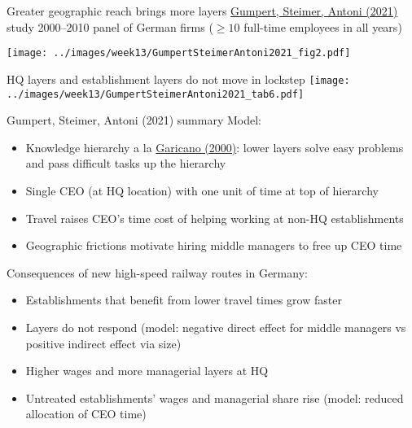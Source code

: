 \documentclass[11pt,notes=hide,aspectratio=169]{beamer}
\begin{document}
\begin{frame}{Greater geographic reach brings more layers}
\href{https://doi.org/10.1093/qje/qjab049}{Gumpert, Steimer, Antoni (2021)} study 2000–2010 panel of German firms ($\geq 10$ full-time employees in all years)
\begin{center}
\texttt{[image: ../images/week13/GumpertSteimerAntoni2021\_fig2.pdf]}
\end{center}
\end{frame}
\begin{frame}{HQ layers and establishment layers do not move in lockstep}
\texttt{[image: ../images/week13/GumpertSteimerAntoni2021\_tab6.pdf]}
\end{frame}
\begin{frame}{Gumpert, Steimer, Antoni (2021) summary}
Model:
\begin{itemize}
\item Knowledge hierarchy a la \href{https://doi.org/10.1086/317671}{Garicano (2000)}: lower layers solve easy problems and pass difficult tasks up the hierarchy
\item Single CEO (at HQ location) with one unit of time at top of hierarchy
\item Travel raises CEO's time cost of helping working at non-HQ establishments
\item Geographic frictions motivate hiring middle managers to free up CEO time
\end{itemize}
Consequences of new high-speed railway routes in Germany:
\begin{itemize}
\item Establishments that benefit from lower travel times grow faster
\item Layers do not respond (model: negative direct effect for middle managers vs positive indirect effect via size)
\item Higher wages and more managerial layers at HQ
\item Untreated establishments' wages and managerial share rise (model: reduced allocation of CEO time)
\end{itemize}
\end{frame}
\end{document}

